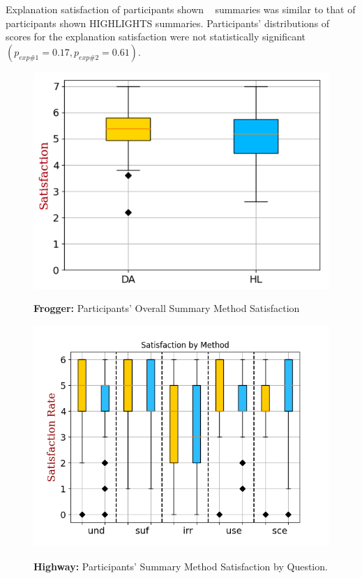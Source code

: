 Explanation satisfaction of participants shown \disalg~ summaries was similar to that of participants shown HIGHLIGHTS summaries. Participants’ distributions of scores for the explanation satisfaction were not statistically significant $(p_{exp\#1} = 0.17, p_{exp\#2} = 0.61)$.

\begin{figure}[ht]
	\centering
    \includegraphics[width=0.98\columnwidth]{images/sat.png}\\
	\caption{\textbf{Frogger:} Participants' Overall Summary Method Satisfaction}
	\label{fig: pref}
\end{figure}

\begin{figure}[ht]
	\centering
    \includegraphics[width=0.98\columnwidth]{images/Satisfaction.png}\\
	\caption{\textbf{Highway:} Participants' Summary Method Satisfaction by Question.}
	\label{fig: pref}
\end{figure}


